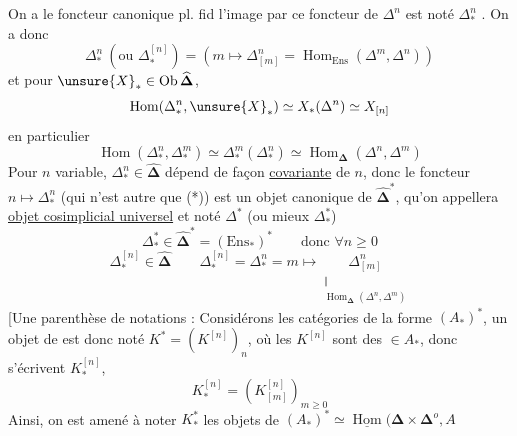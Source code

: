 On a le foncteur canonique pl. fid
l'image par ce foncteur de $\Delta^n$ est noté $\Delta^n_*$ . On a donc
\[
\Delta^n_*\ (\text{ou }\Delta^{[n]}_*)=(m\longmapsto\Delta^n_{[m]}=\operatorname{Hom}_{\mathrm{Ens}}(\Delta^m,\Delta^n))
\]
et pour $\unsure{X}_*\in\operatorname{Ob}\widehat{\boldsymbol\Delta}$,
\[
\operatorname{Hom}(\Delta^n_*,\unsure{X}_*)\simeq X_*(\Delta^n)\simeq X_{[n]}
\]
en particulier
\[
\operatorname{Hom}(\Delta^n_*,\Delta^m_*)\simeq\Delta^m_*(\Delta^n_*)\simeq\operatorname{Hom}_{\boldsymbol\Delta}(\Delta^n,\Delta^m)
\]
Pour $n$ variable, $\Delta^n_*\in\widehat{\boldsymbol\Delta}$ dépend de façon \uline{covariante} de $n$,  donc le foncteur $n\longmapsto\Delta^n_*$ (qui n'est autre que (*)) est un objet canonique de $\widehat{\boldsymbol\Delta}^*$, qu'on appellera \uline{objet cosimplicial universel} et noté $\Delta^*$ (ou mieux $\Delta^*_*${)}
\[
\Delta^*_*\in\widehat{\boldsymbol\Delta}^*=(\mathrm{Ens}_*)^*\qquad\text{donc }\forall n\geq0
\]
\[
\Delta^{[n]}_*\in\widehat{\boldsymbol\Delta}\qquad
\Delta^{[n]}_*=\Delta^n_*=m\longmapsto
\underset{\substack{\Vert\\\operatorname{Hom}_{\boldsymbol\Delta}(\Delta^n,\Delta^m)}}{\Delta^n_{[m]}}
\]
[Une parenthèse de notations : Considérons les catégories de la forme $(A_*)^*$, un objet de  est donc noté $K^*=(K^{[n]})_n$, où les $K^{[n]}$ sont des $\in A_*$, donc s'écrivent $K^{[n]}_*$,
\[ K^{[n]}_*=(K^{[n]}_{[m]})_{m\geq0} \]
Ainsi, on est amené à noter $K^*_* $ les objets de $(A_*)^*\simeq\underline{\operatorname{Hom}}(\boldsymbol\Delta\times\boldsymbol\Delta^o,A$

